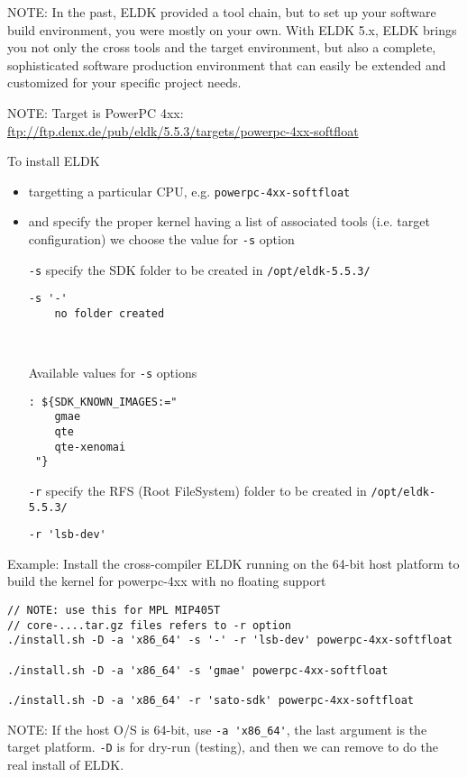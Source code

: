 NOTE: In the past, ELDK provided a tool chain, but to set up your software build
environment, you were mostly on your own.
With ELDK 5.x, ELDK brings you not only the cross tools and the target
environment, but also a complete, sophisticated software production environment
that can easily be extended and customized for your specific project needs.

NOTE: Target is PowerPC 4xx: \url{ftp://ftp.denx.de/pub/eldk/5.5.3/targets/powerpc-4xx-softfloat}

To install ELDK 
\begin{itemize}
  \item targetting a particular CPU, e.g. \verb!powerpc-4xx-softfloat!
  
  \item and specify the proper kernel having a list of associated tools (i.e.
  target configuration) we choose the value for \verb!-s! option

\verb!-s! specify the SDK folder to be created in \verb!/opt/eldk-5.5.3/!
\begin{verbatim}
-s '-' 
    no folder created
    
    
\end{verbatim}
Available values for \verb!-s! options
\begin{verbatim}
: ${SDK_KNOWN_IMAGES:="
    gmae
    qte
    qte-xenomai
 "}
\end{verbatim}

\verb!-r! specify the RFS (Root FileSystem) folder to be created in
\verb!/opt/eldk-5.5.3/!
\begin{verbatim}
-r 'lsb-dev'
\end{verbatim}

\end{itemize}

Example: Install the cross-compiler ELDK running on the 64-bit host platform to
build the kernel for powerpc-4xx with no floating support 
\begin{verbatim}
// NOTE: use this for MPL MIP405T
// core-....tar.gz files refers to -r option
./install.sh -D -a 'x86_64' -s '-' -r 'lsb-dev' powerpc-4xx-softfloat

./install.sh -D -a 'x86_64' -s 'gmae' powerpc-4xx-softfloat

./install.sh -D -a 'x86_64' -r 'sato-sdk' powerpc-4xx-softfloat
\end{verbatim}
NOTE: If the host O/S is 64-bit, use \verb!-a 'x86_64'!, the last argument is
the target platform. \verb!-D! is for dry-run (testing), and then
we can remove to do the real install of ELDK.


